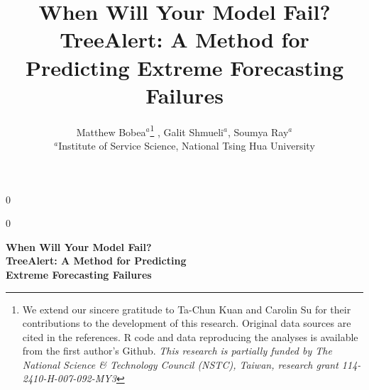 \documentclass[12pt]{article}
\newcommand{\blind}{0}
\begin{document}

\def\spacingset#1{\renewcommand{\baselinestretch}%
{#1}\small\normalsize} \spacingset{1}

\blind
{
  \title{When Will Your Model Fail?\\TreeAlert: A Method for Predicting Extreme Forecasting Failures}
  \author{Matthew Bobea$^{a}$\thanks{We extend our sincere gratitude to Ta-Chun Kuan and Carolin Su for their contributions to the development of this research. Original data sources are cited in the references. R code and data reproducing the analyses is available from the first author's Github. \textit{This research is partially funded by The National Science \& Technology Council (NSTC), Taiwan, research grant 114-2410-H-007-092-MY3}}%
    , Galit Shmueli$^{a}$, %
    Soumya Ray$^{a}$ \\[6pt]
    $^{a}$Institute of Service Science, National Tsing Hua University}
  \maketitle

} \fi
{}\blind
{
  \bigskip
  \bigskip
  \bigskip
  \begin{center}
    {\LARGE\bf When Will Your Model Fail?}\\[10pt]
    {\LARGE\bf TreeAlert: A Method for Predicting}\\[10pt] 
    {\LARGE\bf Extreme Forecasting Failures}
  \end{center}
  \medskip
} \fi
\end{document}
